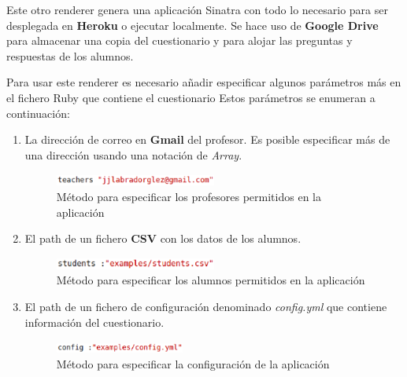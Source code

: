 

Este otro renderer genera una aplicaci\'on Sinatra con todo lo necesario para ser desplegada en {\bfseries Heroku} o ejecutar localmente. 
Se hace uso de {\bfseries Google Drive} para almacenar una copia del cuestionario y para alojar las preguntas y respuestas de los alumnos.

Para usar este renderer es necesario a\~{n}adir especificar algunos par\'ametros m\'as en el fichero Ruby que contiene el cuestionario
Estos par\'ametros se enumeran a continuaci\'on:

\begin{enumerate}
  \item La direcci\'on de correo en {\bfseries Gmail} del profesor. Es posible especificar m\'as de una direcci\'on usando una notaci\'on
  de \textit{Array}.
  \begin{figure}[!th]
  \begin{center}
  \includegraphics[width=0.5\textwidth]{images/teachers.eps}
  \caption{M\'etodo para especificar los profesores permitidos en la aplicaci\'on}
  \label{fig:teachers}
  \end{center}
  \end{figure}
  
  \item El path de un fichero {\bfseries CSV} con los datos de los alumnos.
  \begin{figure}[!th]
  \begin{center}
  \includegraphics[width=0.5\textwidth]{images/students.eps}
  \caption{M\'etodo para especificar los alumnos permitidos en la aplicaci\'on}
  \label{fig:students}
  \end{center}
  \end{figure}
  \newpage
  
  \item El path de un fichero de configuraci\'on denominado \textit{config.yml} que contiene informaci\'on del cuestionario.
  \begin{figure}[!th]
  \begin{center}
  \includegraphics[width=0.4\textwidth]{images/config.eps}
  \caption{M\'etodo para especificar la configuraci\'on de la aplicaci\'on}
  \label{fig:config}
  \end{center}
  \end{figure}
  
\end{enumerate}

